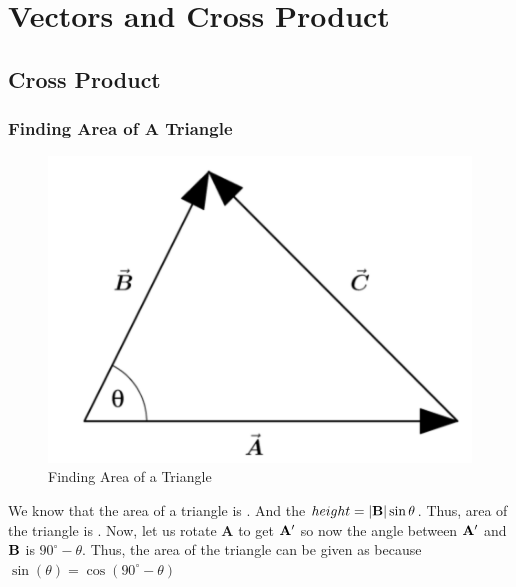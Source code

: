

\chapter{Vectors and Cross Product}  

\bigbreak
\section{Cross Product}

\subsection{Finding Area of A Triangle}

\begin{figure}[ht!]
    \centering
    \includegraphics[scale=0.5]{./images/lecture_2_figure_1.png}
    \caption{Finding Area of a Triangle}
\end{figure}

We know that the area of a triangle is .
And the $height = |{\bf B}| \sin \theta$. 
Thus, area of the triangle is .
Now, let us rotate {\bf A} to get ${\bf A'}$ so now the angle between ${\bf A'}$ and ${\bf B}$ is $90^{\circ} - \theta$.
Thus, the area of the triangle can be given as  because $ \sin(\theta) = \cos(90^{\circ} - \theta) $

